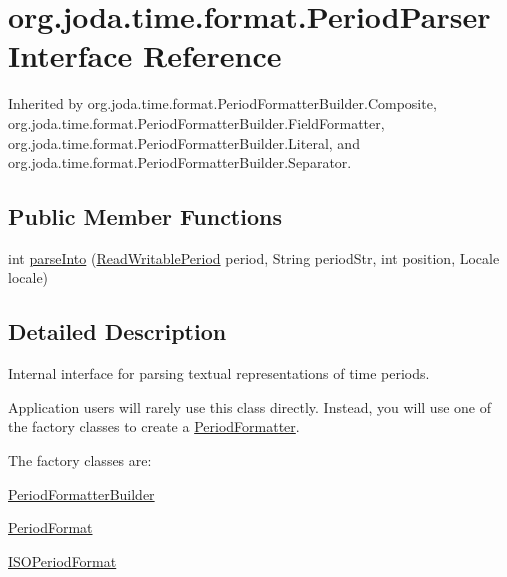 \hypertarget{interfaceorg_1_1joda_1_1time_1_1format_1_1_period_parser}{\section{org.\-joda.\-time.\-format.\-Period\-Parser Interface Reference}
\label{interfaceorg_1_1joda_1_1time_1_1format_1_1_period_parser}
}


Inherited by org.\-joda.\-time.\-format.\-Period\-Formatter\-Builder.\-Composite, org.\-joda.\-time.\-format.\-Period\-Formatter\-Builder.\-Field\-Formatter, org.\-joda.\-time.\-format.\-Period\-Formatter\-Builder.\-Literal, and org.\-joda.\-time.\-format.\-Period\-Formatter\-Builder.\-Separator.

\subsection*{Public Member Functions}
\begin{DoxyCompactItemize}
\item 
int \hyperlink{interfaceorg_1_1joda_1_1time_1_1format_1_1_period_parser_a499cb819b1f8e114a050032e2cbba42e}{parse\-Into} (\hyperlink{interfaceorg_1_1joda_1_1time_1_1_read_writable_period}{Read\-Writable\-Period} period, String period\-Str, int position, Locale locale)
\end{DoxyCompactItemize}


\subsection{Detailed Description}
Internal interface for parsing textual representations of time periods. 

Application users will rarely use this class directly. Instead, you will use one of the factory classes to create a \hyperlink{classorg_1_1joda_1_1time_1_1format_1_1_period_formatter}{Period\-Formatter}. 

The factory classes are\-:\par

\begin{DoxyItemize}
\item \hyperlink{classorg_1_1joda_1_1time_1_1format_1_1_period_formatter_builder}{Period\-Formatter\-Builder}\par

\item \hyperlink{classorg_1_1joda_1_1time_1_1format_1_1_period_format}{Period\-Format}\par

\item \hyperlink{classorg_1_1joda_1_1time_1_1format_1_1_i_s_o_period_format}{I\-S\-O\-Period\-Format}\par

\end{DoxyItemize}


